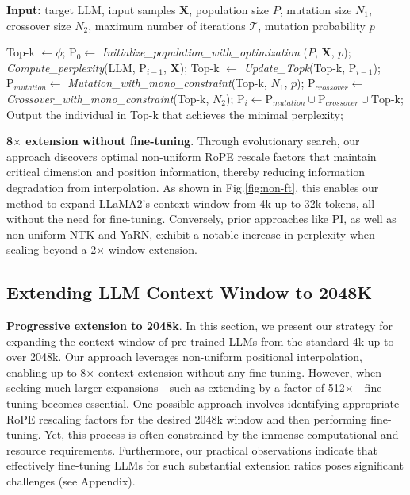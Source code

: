 \begin{algorithm}[t]
	\small
	\caption{The search algorithm}
	\textbf{Input:} target LLM, input samples $\mathbf{X}$, population size $P$, mutation size $N_1$, crossover size $N_2$, maximum number of iterations $\mathcal{T}$, mutation probability $p$\\

	\begin{algorithmic}[1]
		\label{alg:search}
		\STATE Top-k $\leftarrow \phi$;	
		\STATE $\text{P}_0 \leftarrow$ \textit{Initialize\_population\_with\_optimization} ($P$, $\mathbf{X}$, $p$); 
		\STATE \textit{Compute\_perplexity}(LLM, $\text{P}_{i-1}$, $\mathbf{X}$);
		\STATE Top-k $\leftarrow$ \textit{Update\_Topk}(Top-k, $\text{P}_{i-1}$);
		\STATE $\text{P}_{mutation} \leftarrow$ \textit{Mutation\_with\_mono\_constraint}(Top-k, $N_1$, $p$); 
		\STATE $\text{P}_{crossover} \leftarrow$ \textit{Crossover\_with\_mono\_constraint}(Top-k, $N_2$);
		\STATE $\text{P}_i \leftarrow \text{P}_{mutation} \cup \text{P}_{crossover} \cup \text{Top-k}$;
		\ENDFOR
		\STATE Output the individual in Top-k that achieves the minimal perplexity;
	\end{algorithmic}
\end{algorithm}

\textbf{8$\times$ extension without fine-tuning}. Through evolutionary search, our approach discovers optimal non-uniform RoPE rescale factors that maintain critical dimension and position information, thereby reducing information degradation from interpolation. As shown in Fig.\ref{fig:non-ft}, this enables our method to expand LLaMA2's context window from 4k up to 32k tokens, all without the need for fine-tuning. Conversely, prior approaches like PI, as well as non-uniform NTK and YaRN, exhibit a notable increase in perplexity when scaling beyond a 2$\times$ window extension.

\subsection{Extending LLM Context Window to 2048K}
\label{sec:extendto2048k}

\textbf{Progressive extension to 2048k}. In this section, we present our strategy for expanding the context window of pre-trained LLMs from the standard 4k up to over 2048k. Our approach leverages non-uniform positional interpolation, enabling up to 8$\times$ context extension without any fine-tuning. However, when seeking much larger expansions—such as extending by a factor of 512$\times$—fine-tuning becomes essential. One possible approach involves identifying appropriate RoPE rescaling factors for the desired 2048k window and then performing fine-tuning. Yet, this process is often constrained by the immense computational and resource requirements. Furthermore, our practical observations indicate that effectively fine-tuning LLMs for such substantial extension ratios poses significant challenges (see Appendix).

